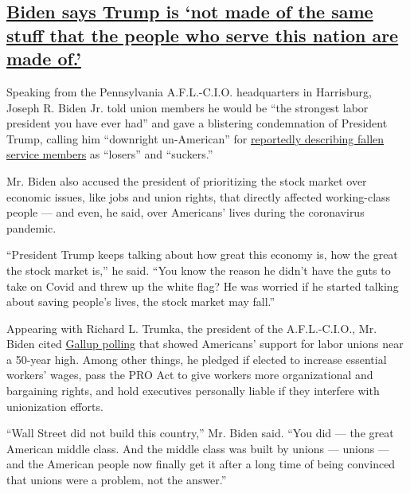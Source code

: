 \hypertarget{biden-says-trump-is-not-made-of-the-same-stuff-that-the-people-who-serve-this-nation-are-made-of}{%
\subsection{\texorpdfstring{\protect\hyperlink{biden-says-trump-is-not-made-of-the-same-stuff-that-the-people-who-serve-this-nation-are-made-of}{Biden
says Trump is `not made of the same stuff that the people who serve this
nation are made
of.'}}{Biden says Trump is `not made of the same stuff that the people who serve this nation are made of.'}}\label{biden-says-trump-is-not-made-of-the-same-stuff-that-the-people-who-serve-this-nation-are-made-of}}

Speaking from the Pennsylvania A.F.L.-C.I.O. headquarters in Harrisburg,
Joseph R. Biden Jr. told union members he would be ``the strongest labor
president you have ever had'' and gave a blistering condemnation of
President Trump, calling him ``downright un-American'' for
\href{https://www.theatlantic.com/politics/archive/2020/09/trump-americans-who-died-at-war-are-losers-and-suckers/615997/}{reportedly
describing fallen service members} as ``losers'' and ``suckers.''

Mr. Biden also accused the president of prioritizing the stock market
over economic issues, like jobs and union rights, that directly affected
working-class people --- and even, he said, over Americans' lives during
the coronavirus pandemic.

``President Trump keeps talking about how great this economy is, how the
great the stock market is,'' he said. ``You know the reason he didn't
have the guts to take on Covid and threw up the white flag? He was
worried if he started talking about saving people's lives, the stock
market may fall.''

Appearing with Richard L. Trumka, the president of the A.F.L.-C.I.O.,
Mr. Biden cited
\href{https://news.gallup.com/poll/265916/labor-day-turns-125-union-approval-near-year-high.aspx}{Gallup
polling} that showed Americans' support for labor unions near a 50-year
high. Among other things, he pledged if elected to increase essential
workers' wages, pass the PRO Act to give workers more organizational and
bargaining rights, and hold executives personally liable if they
interfere with unionization efforts.

``Wall Street did not build this country,'' Mr. Biden said. ``You did
--- the great American middle class. And the middle class was built by
unions --- unions --- and the American people now finally get it after a
long time of being convinced that unions were a problem, not the
answer.''

